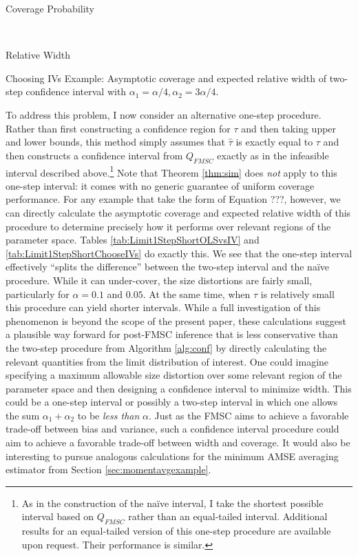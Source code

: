 \begin{table}[h]
  \centering
  \begin{subtable}{0.48\textwidth}
    \caption{Coverage Probability}
    
  \end{subtable}
  ~
  \begin{subtable}{0.48\textwidth}
    \caption{Relative Width}
    
  \end{subtable}
  \caption{Choosing IVs Example: Asymptotic coverage and expected relative width of two-step confidence interval with $\alpha_1 = \alpha/4,  \alpha_2 = 3\alpha/4$.}
  \label{tab:Limit2StepWideTauChooseIVs}
\end{table}

To address this problem, I now consider an alternative one-step procedure.
Rather than first constructing a confidence region for $\tau$ and then taking upper and lower bounds, this method simply assumes that $\widehat{\tau}$ is exactly equal to $\tau$ and then constructs a confidence interval from $Q_{FMSC}$ exactly as in the infeasible interval described above.\footnote{As in the construction of the na\"{i}ve interval, I take the shortest possible interval based on $Q_{FMSC}$ rather than an equal-tailed interval. Additional results for an equal-tailed version of this one-step procedure are available upon request. Their performance is similar.}
Note that Theorem \ref{thm:sim} does \emph{not} apply to this one-step interval: it comes with no generic guarantee of uniform coverage performance.
For any example that take the form of Equation ???, however, we can directly calculate the asymptotic coverage and expected relative width of this procedure to determine precisely how it performs over relevant regions of the parameter space.
Tables \ref{tab:Limit1StepShortOLSvsIV} and \ref{tab:Limit1StepShortChooseIVs} do exactly this.
We see that the one-step interval effectively ``splits the difference'' between the two-step interval and the na\"{i}ve procedure. 
While it can under-cover, the size distortions are fairly small, particularly for $\alpha=0.1$ and $0.05$.
At the same time, when $\tau$ is relatively small this procedure can yield shorter intervals.
While a full investigation of this phenomenon is beyond the scope of the present paper, these calculations suggest a plausible way forward for post-FMSC inference that is less conservative than the two-step procedure from Algorithm \ref{alg:conf} by directly calculating the relevant quantities from the limit distribution of interest.
One could imagine specifying a maximum allowable size distortion over some relevant region of the parameter space and then designing a confidence interval to minimize width.
This could be a one-step interval or possibly a two-step interval in which one allows the sum $\alpha_1 + \alpha_2$ to be \emph{less than} $\alpha$.
Just as the FMSC aims to achieve a favorable trade-off between bias and variance, such a confidence interval procedure could aim to achieve a favorable trade-off between width and coverage.
It would also be interesting to pursue analogous calculations for the minimum AMSE averaging estimator from Section \ref{sec:momentavgexample}.

